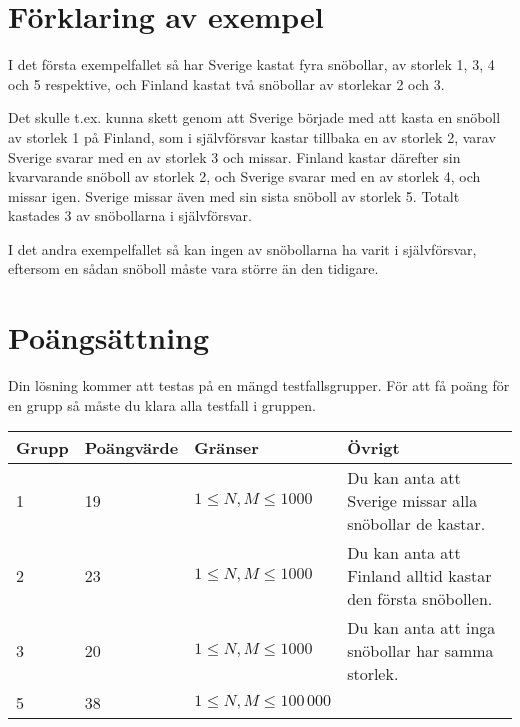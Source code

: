 \section*{Förklaring av exempel}

I det första exempelfallet så har Sverige kastat fyra snöbollar, av storlek 1, 3, 4 och 5 respektive, och Finland kastat två snöbollar av storlekar 2 och 3.

Det skulle t.ex. kunna skett genom att Sverige började med att kasta en snöboll av storlek 1 på Finland, som i självförsvar kastar tillbaka en av storlek 2, varav Sverige svarar med en av storlek 3 och missar.
Finland kastar därefter sin kvarvarande snöboll av storlek 2, och Sverige svarar med en av storlek 4, och missar igen. Sverige missar även med sin sista snöboll av storlek 5. Totalt kastades 3 av snöbollarna i självförsvar.

I det andra exempelfallet så kan ingen av snöbollarna ha varit i självförsvar, eftersom en sådan snöboll måste vara större än den tidigare.

\section*{Poängsättning}

Din lösning kommer att testas på en mängd testfallsgrupper. För att få poäng för en grupp
så måste du klara alla testfall i gruppen.

\begin{tabular}{| l | l | l | l |}
\hline
Grupp & Poängvärde & Gränser & Övrigt \\ \hline
1     & 19         &  $1 \le N,M \le 1000$ & Du kan anta att Sverige missar alla snöbollar de kastar. \\ \hline
2     & 23         &  $1 \le N,M \le 1000$ & Du kan anta att Finland alltid kastar den första snöbollen. \\ \hline
3     & 20         &  $1 \le N,M \le 1000$ & Du kan anta att inga snöbollar har samma storlek. \\ \hline
5     & 38         &  $1 \le N,M \le 100\,000$ & \\ \hline
\end{tabular}
